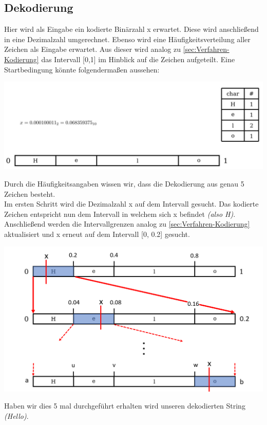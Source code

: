 \documentclass[a4paper]{article}
\theoremstyle{definition}
\theoremstyle{remark}
\begin{document}
\subsection{Dekodierung}
Hier wird als Eingabe ein kodierte Binärzahl x erwartet. Diese wird anschließend in eine Dezimalzahl umgerechnet. Ebenso wird eine Häufigkeitsverteilung aller Zeichen als Eingabe erwartet. Aus dieser wird analog zu \ref{sec:Verfahren-Kodierung} das Intervall [0,1] im Hinblick auf die Zeichen aufgeteilt. Eine Startbedingung könnte folgendermaßen aussehen:
\begin{center}
\includegraphics[scale=0.5]{dec-schritt1}
\end{center}
Durch die Häufigkeitsangaben wissen wir, dass die Dekodierung aus genau 5 Zeichen besteht.\\
Im ersten Schritt wird die Dezimalzahl x auf dem Intervall gesucht. Das kodierte Zeichen entspricht nun dem Intervall in welchem sich x befindet \textit{(also H)}.
\\
Anschließend werden die Intervallgrenzen analog zu \ref{sec:Verfahren-Kodierung}
aktualisiert und x erneut auf dem Intervall [0, 0.2] gesucht.
\begin{center}
\includegraphics[scale=0.5]{dec-schritt2}
\end{center}
Haben wir dies 5 mal durchgeführt erhalten wird unseren dekodierten String \textit{(Hello)}.
\newpage
\end{document}
